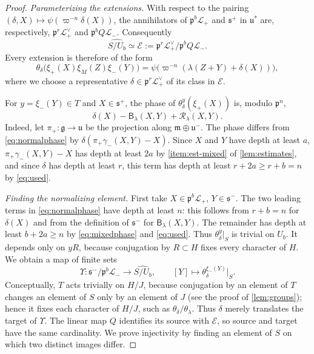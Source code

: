\documentclass[11pt,reqno]{amsart}
\numberwithin{equation}{section}
\theoremstyle{plain}
\theoremstyle{definition}
\theoremstyle{remark}
\theoremstyle{plain}
\newcommand{\pp}{\mathfrak{p}}   %
\newcommand{\Lat}{\mathcal{L}}   %
\newcommand{\g}{\mathfrak{g}}    %
\newcommand{\uu}{\mathfrak{u}}   %
\newcommand{\m}{\mathfrak{m}}    %
\newcommand{\sS}{\mathfrak{s}^+}   %
\newcommand{\sT}{\mathfrak{s}^-}   %
\newcommand{\lf}{\lambda}
\newcommand{\Bf}{\mathsf{B}}
\begin{document}
\begin{proof}
\emph{Parameterizing the extensions.}
With respect to the pairing
$(\delta,X)\mapsto\psi(\varpi^{-n}\delta(X))$, the annihilators of
$\pp^b\Lat_+$ and $\sS$ in $\uu^*$ are, respectively,
$\pp^r\Lat_+^\vee$ and $\pp^bQ\Lat_-$. Consequently
\[
\widehat{S/U_b}\simeq
\mathcal E:=\pp^r\Lat_+^\vee/\pp^bQ\Lat_-.
\]
Every extension is therefore of the form
\[
\theta_\delta\bigl(\xi_+(X)\xi_M(Z)\xi_-(Y)\bigr)
=\psi\bigl(\varpi^{-n}(\lf(Z+Y)+\delta(X))\bigr),
\]
where we choose a representative
$\delta\in\pp^r\Lat_+^\vee$ of its class in $\mathcal E$.

For $y=\xi_-(Y)\in T$ and $X\in\sS$, the phase of
$\theta_\delta^y(\xi_+(X))$ is, modulo $\pp^n$,
\begin{equation}\label{eq:normalphase}
\delta(X)-\Bf_\lf(X,Y)+\mathscr R_\lf(X,Y).
\end{equation}
Indeed, let $\pi_+:\g\to\uu$ be the projection along $\m\oplus\uu^-$.
The phase differs from \eqref{eq:normalphase} by
$\delta(\pi_+\gamma_-(X,Y)-X)$. Since $X$ and $Y$ have depth at least $a$,
$\pi_+\gamma_-(X,Y)-X$ has depth at least $2a$ by
\cref{item:est-mixed} of \cref{lem:estimates}, and since $\delta$ has depth at
least $r$, this term has depth at least $r+2a\ge r+b=n$ by \eqref{eq:used}.

\smallskip\noindent\emph{Finding the normalizing element.}
First take $X\in\pp^b\Lat_+$, $Y\in\sT$. The two leading
terms in \eqref{eq:normalphase} have depth at least $n$: this follows
from $r+b=n$ for $\delta(X)$ and from the definition of $\sT$ for
$\Bf_\lf(X,Y)$. The remainder has depth at least
$b+2a\ge n$ by \eqref{eq:mixedphase} and \eqref{eq:used}.
Thus $\theta_\delta^y|_S$ is trivial on $U_b$.
It depends only on $yR$, because conjugation by $R\subset H$ fixes
every character of $H$. We obtain a map of finite sets
\[
\Upsilon:\sT/\pp^b\Lat_-\longrightarrow\widehat{S/U_b},
\qquad [Y]\longmapsto\theta_\delta^{\xi_-(Y)}|_S.
\]
Conceptually, $T$ acts trivially on $H/J$, because conjugation by an
element of $T$ changes an element of $S$ only by an element of $J$ (see the
proof of \cref{lem:groups}); hence it fixes each character of $H/J$, such as
$\theta_\delta/\theta_\lf$. Thus $\delta$ merely translates the target of $\Upsilon$.
The linear map $Q$ identifies its source with $\mathcal E$, so source
and target have the same cardinality. We prove injectivity by finding
an element of $S$ on which two distinct images differ.


\end{proof}
\end{document}
